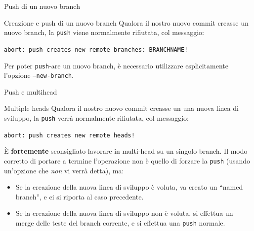 \documentclass[presentation]{beamer}
\begin{document}
\begin{frame}{Push di un nuovo branch}
	\begin{block}{Creazione e push di un nuovo branch}
		Qualora il nostro nuovo commit creasse un nuovo branch, la \texttt{push} viene normalmente rifiutata, col messaggio:
		
		\texttt{abort: push creates new remote branches: BRANCHNAME!}
		
		Per poter \texttt{push}-are un nuovo branch, è necessario utilizzare esplicitamente l'opzione \texttt{--new-branch}.
	\end{block}
\end{frame}

\begin{frame}{Push e multihead}
	\begin{block}{Multiple heads}
		Qualora il nostro nuovo commit creasse un una nuova linea di sviluppo, la \texttt{push} verrà normalmente rifiutata, col messaggio:
		
		\texttt{abort: push creates new remote heads!}
		
		È \textbf{fortemente} sconsigliato lavorare in multi-head su un singolo branch. Il modo corretto di portare a termine l'operazione non è quello di forzare la \texttt{push} (usando un'opzione che \emph{non} vi verrà detta), ma:
		\begin{itemize}
			\item Se la creazione della nuova linea di sviluppo è voluta, va creato un ``named branch'', e ci si riporta al caso precedente.
			\item Se la creazione della nuova linea di sviluppo non è voluta, si effettua un merge delle teste del branch corrente, e si effettua una \texttt{push} normale.
		\end{itemize}
	\end{block}
\end{frame}


\end{document}

